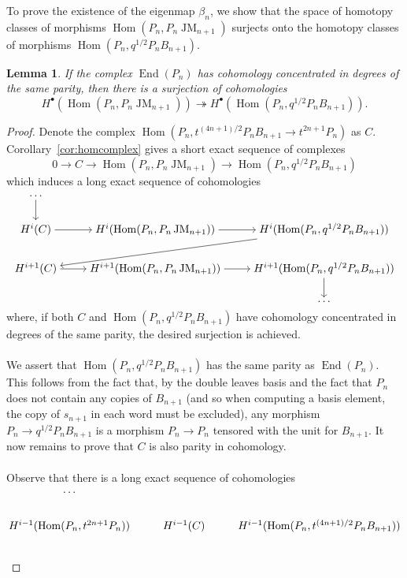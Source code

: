 \documentclass[11pt]{article}
\DeclareMathOperator{\Hom}{Hom}
\DeclareMathOperator{\End}{End}
\DeclareMathOperator{\JM}{JM}
\newtheorem{lemma}[thm]{Lemma}
\theoremstyle{definition}
\theoremstyle{remark}
\numberwithin{equation}{section}
\begin{document}
\noindent To prove the existence of the eigenmap $\beta_n$, we show that
the space of homotopy classes of morphisms
$\Hom(P_n,P_n\JM_{n+1})$ surjects onto the homotopy classes of morphisms
$\Hom(P_n,q^{1/2}P_nB_{n+1})$.
\begin{lemma}
	\label{lem:homspacesurjection}
	If the complex $\End(P_n)$ has cohomology concentrated in degrees of the
	same parity, then
	there is a surjection of cohomologies
	\[H^\bullet(\Hom(P_n,P_n\JM_{n+1})) \twoheadrightarrow
		H^\bullet(\Hom(P_n,q^{1/2}P_nB_{n+1})).
	\]
\end{lemma}
\begin{proof}
	Denote the complex $\Hom(P_n,t^{(4n+1)/2}P_nB_{n+1}\to t^{2n+1}P_n)$ as $C$.
	Corollary~\ref{cor:homcomplex} gives a short exact sequence of complexes
	\[0\to C \to \Hom(P_n,P_n\JM_{n+1}) \to
	\Hom(P_n,q^{1/2}P_nB_{n+1})\]
	which induces a long exact sequence of cohomologies
	\[\begin{tikzcd}[ampersand replacement=\&,cramped]
	\dots \&\& \\
	{H^i(C)} \& {H^i(\Hom(P_n,P_n\JM_{n+1}))} \& {H^i(\Hom(P_n,q^{1/2}P_{n}B_{n+1}))} \\
	{H^{i+1}(C)} \& {H^{i+1}(\Hom(P_n,P_n\JM_{n+1}))} \& {H^{i+1}(\Hom(P_n,q^{1/2}P_{n}B_{n+1}))} \\
	\&\& \dots
	\arrow[from=1-1, to=2-1]
	\arrow[from=2-1, to=2-2]
	\arrow[from=2-2, to=2-3]
	\arrow[from=2-3, to=3-1]
	\arrow[from=3-1, to=3-2]
	\arrow[from=3-2, to=3-3]
	\arrow[from=3-3, to=4-3]
\end{tikzcd}\]
where, if both $C$ and $\Hom(P_n,q^{1/2}P_nB_{n+1})$ have cohomology
concentrated in degrees of the same parity, the desired surjection is achieved.
\\ \\
We assert that $\Hom(P_n,q^{1/2}P_nB_{n+1})$ has the same parity as
$\End(P_n)$. This follows from the fact that, by the double leaves basis
and the fact that $P_n$ does not contain any copies of $B_{n+1}$ (and so
when computing a basis element, the copy of $s_{n+1}$ in each word must
be excluded), any
morphism $P_n\to q^{1/2}P_nB_{n+1}$ is a morphism $P_n\to P_{n}$ tensored with
the unit for $B_{n+1}$. It now remains to prove that $C$ is also
parity in cohomology.
\\ \\
Observe that there is a long exact sequence of cohomologies
\[\begin{tikzcd}[ampersand replacement=\&,cramped]
	\dots \&\& \\
	{H^{i-1}(\Hom(P_n,t^{2n+1}P_n))} \& {H^{i-1}(C)} \& {H^{i-1}(\Hom(P_n,t^{(4n+1)/2}P_nB_{n+1}))} \\

\end{tikzcd}\]
\end{proof}
\end{document}
